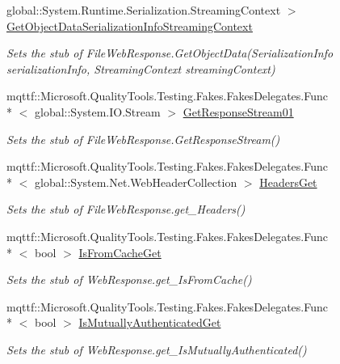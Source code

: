 \begin{DoxyCompactItemize}
global\-::\-System.\-Runtime.\-Serialization.\-Streaming\-Context $>$ \hyperlink{class_system_1_1_net_1_1_fakes_1_1_stub_file_web_response_ae30e7d4dde452d1f097224732ceb0d8b}{Get\-Object\-Data\-Serialization\-Info\-Streaming\-Context}
\begin{DoxyCompactList}\small\item\em Sets the stub of File\-Web\-Response.\-Get\-Object\-Data(\-Serialization\-Info serialization\-Info, Streaming\-Context streaming\-Context)\end{DoxyCompactList}\item 
mqttf\-::\-Microsoft.\-Quality\-Tools.\-Testing.\-Fakes.\-Fakes\-Delegates.\-Func\\*
$<$ global\-::\-System.\-I\-O.\-Stream $>$ \hyperlink{class_system_1_1_net_1_1_fakes_1_1_stub_file_web_response_a14e07419076bea9fcb16c938caf30f43}{Get\-Response\-Stream01}
\begin{DoxyCompactList}\small\item\em Sets the stub of File\-Web\-Response.\-Get\-Response\-Stream()\end{DoxyCompactList}\item 
mqttf\-::\-Microsoft.\-Quality\-Tools.\-Testing.\-Fakes.\-Fakes\-Delegates.\-Func\\*
$<$ global\-::\-System.\-Net.\-Web\-Header\-Collection $>$ \hyperlink{class_system_1_1_net_1_1_fakes_1_1_stub_file_web_response_a59b9b69af09e642aa18770bd201d79e0}{Headers\-Get}
\begin{DoxyCompactList}\small\item\em Sets the stub of File\-Web\-Response.\-get\-\_\-\-Headers()\end{DoxyCompactList}\item 
mqttf\-::\-Microsoft.\-Quality\-Tools.\-Testing.\-Fakes.\-Fakes\-Delegates.\-Func\\*
$<$ bool $>$ \hyperlink{class_system_1_1_net_1_1_fakes_1_1_stub_file_web_response_ae37937d3e34b41303d42dc02c9da123b}{Is\-From\-Cache\-Get}
\begin{DoxyCompactList}\small\item\em Sets the stub of Web\-Response.\-get\-\_\-\-Is\-From\-Cache()\end{DoxyCompactList}\item 
mqttf\-::\-Microsoft.\-Quality\-Tools.\-Testing.\-Fakes.\-Fakes\-Delegates.\-Func\\*
$<$ bool $>$ \hyperlink{class_system_1_1_net_1_1_fakes_1_1_stub_file_web_response_a6c6a469839fda0b9bfec61235ccfc9fe}{Is\-Mutually\-Authenticated\-Get}
\begin{DoxyCompactList}\small\item\em Sets the stub of Web\-Response.\-get\-\_\-\-Is\-Mutually\-Authenticated()\end{DoxyCompactList}\item 

\end{DoxyCompactItemize}
